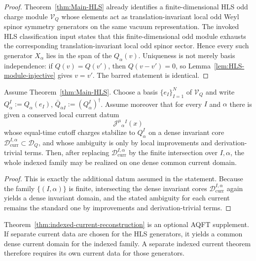\begin{proof}
Theorem~\ref{thm:Main-HLS} already identifies a finite-dimensional HLS odd charge
module \(\mathcal V_Q\) whose elements act as translation-invariant local odd Weyl
spinor symmetry generators on the same vacuum representation. The invoked HLS
classification input states that this finite-dimensional odd module
exhausts the corresponding translation-invariant local odd spinor sector. Hence
every such generator \(X_\alpha\) lies in the span of the \(Q_\alpha(v)\).
Uniqueness is not merely basis independence: if \(Q(v)=Q(v')\), then
\(Q(v-v')=0\), so Lemma~\ref{lem:HLS-module-injective} gives \(v=v'\). The barred
statement is identical.
\end{proof}

\begin{theorem}
\label{thm:indexed-current-reconstruction}
Assume Theorem~\ref{thm:Main-HLS}. Choose a basis \(\{e_I\}_{I=1}^N\) of
\(\mathcal V_Q\) and write
\(
Q_\alpha^I:=Q_\alpha(e_I)
\),
\(
\bar Q_{\dot\alpha I}:=(Q_\alpha^I)^\dagger
\).
Assume moreover that for every \(I\) and \(\alpha\) there is given a conserved local
current datum
\[
\mathcal J^\mu{}_\alpha{}^I(x)
\]
whose equal-time cutoff charges stabilize to \(Q_\alpha^I\) on a dense invariant core
\(\mathcal D_{\mathrm{curr}}^{I,\alpha}\subset\mathcal D_Q\), and whose ambiguity is only
by local improvements and derivation-trivial terms. Then, after replacing
\(\mathcal D_{\mathrm{curr}}^{I,\alpha}\) by the finite intersection over \(I,\alpha\), the
whole indexed family may be realized on one dense common current domain.
\end{theorem}

\begin{proof}
This is exactly the additional datum assumed in the statement. Because the family
\(\{(I,\alpha)\}\) is finite, intersecting the dense invariant cores
\(\mathcal D_{\mathrm{curr}}^{I,\alpha}\) again yields a dense invariant domain, and the
stated ambiguity for each current remains the standard one by improvements and
derivation-trivial terms.
\end{proof}

\begin{remark}
Theorem~\ref{thm:indexed-current-reconstruction} is an optional AQFT
supplement. If separate current data are chosen for the HLS generators, it
yields a common dense current domain for the indexed family. A separate indexed
current theorem therefore requires its own current data for those generators.
\end{remark}

